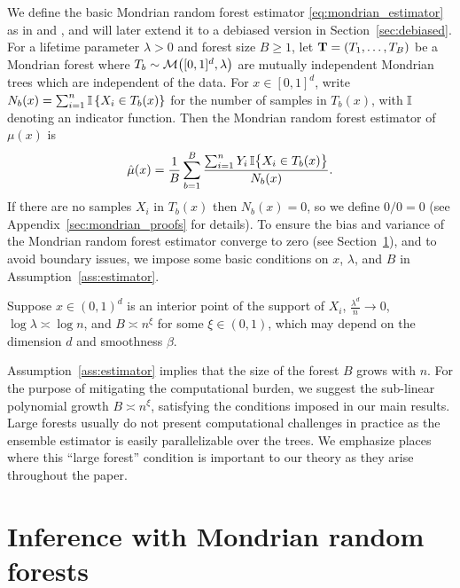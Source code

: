 We define the basic Mondrian random forest estimator
\eqref{eq:mondrian_estimator}
as in \citet{lakshminarayanan2014mondrian} and
\citet{mourtada2020minimax},
and will later extend it to a debiased version
in Section~\ref{sec:debiased}.
For a lifetime parameter $\lambda > 0$ and
forest size $B \geq 1$,
let $\mathbf{T} = (T_1, \ldots, T_B)$ be a Mondrian forest
where $T_b \sim \mathcal{M}\big([0,1]^d, \lambda\big)$ are
mutually independent Mondrian trees which are
independent of the data.
For $x \in [0,1]^d$, write
$N_b(x) = \sum_{i=1}^{n} \mathbb{I} \left\{ X_i \in T_b(x) \right\}$
for the number of samples in $T_b(x)$,
with $\mathbb{I}$ denoting an indicator function.
Then the Mondrian random forest estimator of $\mu(x)$ is
%
\begin{align}
  \label{eq:mondrian_estimator}
  \hat\mu(x)
  =
  \frac{1}{B}
  \sum_{b=1}^B
  \frac{\sum_{i=1}^n Y_i \, \mathbb{I}\big\{ X_i \in T_b(x) \big\}}
  {N_b(x)}.
\end{align}
%
If there are no samples $X_i$ in $T_b(x)$ then $N_b(x) = 0$,
so we define $0/0 = 0$
(see Appendix~\ref{sec:mondrian_proofs} for details).
To ensure the bias and variance of the Mondrian random forest estimator
converge to zero (see Section~\ref{sec:mondrian_inference}),
and to avoid boundary issues,
we impose some basic conditions on
$x$, $\lambda$, and $B$ in Assumption~\ref{ass:estimator}.

\begin{assumption}%
  \label{ass:estimator}
  Suppose $x \in (0,1)^d$ is an interior point of the support of $X_i$,
  $\frac{\lambda^d}{n} \to 0$,
  $\log \lambda \asymp \log n$,
  and $B \asymp n^{\xi}$ for some $\xi \in (0, 1)$,
  which may depend on the dimension $d$ and smoothness $\beta$.
\end{assumption}

Assumption~\ref{ass:estimator} implies that
the size of the forest $B$ grows with $n$.
For the purpose of mitigating the computational burden,
we suggest the sub-linear polynomial growth $B \asymp n^{\xi}$,
satisfying the conditions imposed in our main results.
Large forests usually do not present computational challenges in
practice as the ensemble estimator is easily parallelizable over the trees.
We emphasize places where this ``large forest'' condition is important
to our theory as they arise throughout the paper.

\section{Inference with Mondrian random forests}%
\label{sec:mondrian_inference}

